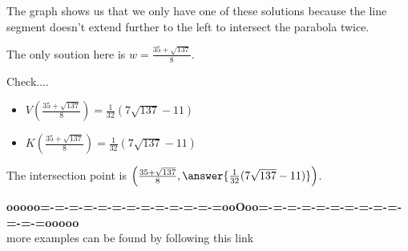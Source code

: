 \documentclass{ximera}
\begin{document}
The graph shows us that we only have one of these solutions because the line segment doesn't extend further to the left to intersect the parabola twice.


The only soution here is $w = \frac{35 + \sqrt{137}}{8} $.








Check....
\begin{itemize}
\item $V\left(\frac{35 + \sqrt{137}}{8}\right) =  \frac{1}{32}(7 \sqrt{137} - 11)  $




\item $K\left(\frac{35 + \sqrt{137}}{8}\right) =  \frac{1}{32}(7 \sqrt{137} - 11)  $
\end{itemize}

\begin{question}
The intersection point is $\left(\frac{35 + \sqrt{137}}{8}, \answer{\frac{1}{32}(7 \sqrt{137} - 11)} \right)$.
\end{question}
















\begin{center}
\textbf{\textcolor{green!50!black}{ooooo=-=-=-=-=-=-=-=-=-=-=-=-=ooOoo=-=-=-=-=-=-=-=-=-=-=-=-=ooooo}} \\

more examples can be found by following this link\\ 

\end{center}
\end{document}
